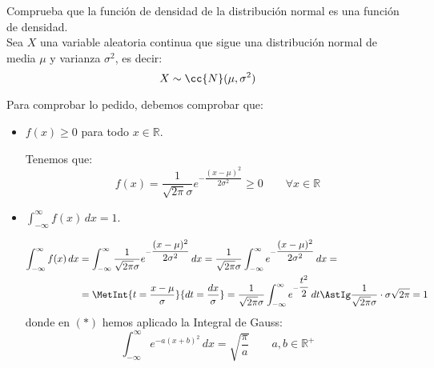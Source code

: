 \begin{ejercicio}
    Comprueba que la función de densidad de la distribución normal es una función de densidad.\\
    
    Sea $X$ una variable aleatoria continua que sigue una distribución normal de media $\mu$ y varianza $\sigma^2$, es decir:
    \begin{equation*}
        X\sim \cc{N}(\mu,\sigma^2)
    \end{equation*}

    Para comprobar lo pedido, debemos comprobar que:
    \begin{itemize}
        \item $f(x)\geq 0$ para todo $x\in \mathbb{R}$.
        
        Tenemos que:
        \begin{equation*}
            f(x) = \dfrac{1}{\sqrt{2\pi}\sigma} e^{-\dfrac{(x-\mu)^2}{2\sigma^2}} \geq 0 \qquad \forall x\in \mathbb{R}
        \end{equation*}
        
        \item $\int_{-\infty}^{\infty} f(x) \, dx = 1$.
        
        \begin{align*}
            \int_{-\infty}^{\infty} f(x) \, dx &= \int_{-\infty}^{\infty} \dfrac{1}{\sqrt{2\pi}\sigma} e^{-\dfrac{(x-\mu)^2}{2\sigma^2}} \, dx = \dfrac{1}{\sqrt{2\pi}\sigma} \int_{-\infty}^{\infty} e^{-\dfrac{(x-\mu)^2}{2\sigma^2}} \, dx =\\
            &= \MetInt{t=\frac{x-\mu}{\sigma}}{dt = \frac{dx}{\sigma}} = \dfrac{1}{\sqrt{2\pi}\sigma} \int_{-\infty}^{\infty} e^{-\dfrac{t^2}{2}} \, dt \AstIg \dfrac{1}{\sqrt{2\pi}\sigma} \cdot \sigma \sqrt{2\pi} = 1
        \end{align*}
        donde en $(\ast)$ hemos aplicado la Integral de Gauss:
        \begin{equation*}
            \int_{-\infty}^{\infty} e^{-a(x+b)^2} \, dx = \sqrt{\dfrac{\pi}{a}} \qquad a,b\in \mathbb{R}^+
        \end{equation*}
    \end{itemize}
\end{ejercicio}



